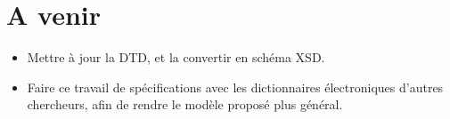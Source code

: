 \documentclass[a4paper,12pt]{article}
\begin{document}
\pagebreak



\section{A venir}

\begin{itemize}
\item Mettre \`a jour la DTD, et la convertir en sch\'ema XSD.
\item Faire ce travail de sp\'ecifications avec les dictionnaires \'electroniques d'autres chercheurs, afin de rendre le mod\`ele propos\'e plus g\'en\'eral.
\end{itemize}
\end{document}
